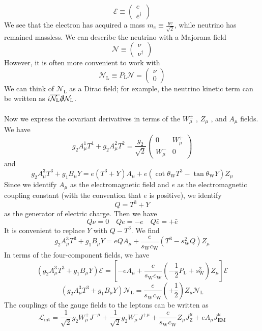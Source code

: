 \[\mathcal{E} \equiv \begin{pmatrix}
e \\ \bar{e}^{\dagger}
\end{pmatrix} \]
We see that the electron has acquired a mass $m_e \equiv \frac{yv}{\sqrt{2}}$, while neutrino has remained massless.
We can describe the neutrino with a Majorana field
\[\mathcal{N} \equiv \begin{pmatrix}
\nu \\ \nu^{\dagger}
\end{pmatrix}\]
However, it is often more convenient to work with
\[\mathcal{N}_{\mathrm{L}} \equiv P_{\mathrm{L}} \mathcal{N} = \begin{pmatrix}
\nu \\ 0
\end{pmatrix}\]
We can think of $\mathcal{N}_{\mathrm{L}}$ as a Dirac field; for example, the neutrino kinetic term can be written as $i\overline{\mathcal{N}_{\mathrm{L}}} \slashed{\partial} \mathcal{N}_{\mathrm{L}}$.
\\ \\
Now we express the covariant derivatives in terms of the $W_{\mu}^{\pm}$ , $Z_{\mu}$ , and $A_{\mu}$ fields. We have
\[g_2 A^1_{\mu}T^1 + g_2 A^2_{\mu}T^2 = \frac{g_2}{\sqrt{2}} \begin{pmatrix}
0 & W_{\mu}^+ \\ W^{-}_{\mu} & 0
\end{pmatrix} \]
and
\[g_2A^3_{\mu}T^3 + g_1 B_{\mu} Y = e(T^3+Y)A_{\mu} + e(\cot\theta_{\mathrm{W}} T^3 - \tan\theta_{\mathrm{W}} Y)Z_{\mu}\]
Since we identify $A_{\mu}$ as the electromagnetic field and $e$ as the electromagnetic coupling constant (with the convention that $e$ is positive), we identify
\[Q = T^3 + Y\]
as the generator of electric charge. Then we have
\[Q\nu = 0 \quad Qe = -e \quad Q\bar{e} = +\bar{e}\]
It is convenient to replace $Y$ with $Q - T^3$. We find
\[g_2A^3_{\mu}T^3 + g_1 B_{\mu} Y = eQA_{\mu} + \frac{e}{s_{\mathrm{W}} c_{\mathrm{W}}}( T^3 -  s_{\mathrm{W}}^2Q)Z_{\mu}\]
In terms of the four-component fields, we have
\[(g_2A^3_{\mu}T^3 + g_1 B_{\mu} Y) \mathcal{E} = \left[-eA_{\mu} + \frac{e}{s_{\mathrm{W}} c_{\mathrm{W}}}( -\frac{1}{2}P_{\mathrm{L}} +  s_{\mathrm{W}}^2)Z_{\mu} \right] \mathcal{E}\]
\[(g_2A^3_{\mu}T^3 + g_1 B_{\mu} Y) \mathcal{N}_{\mathrm{L}} = \frac{e}{s_{\mathrm{W}} c_{\mathrm{W}}} (+\frac{1}{2}) Z_{\mu}\mathcal{N}_{\mathrm{L}} \]
The couplings of the gauge fields to the leptons can be written as
\[\mathcal{L}_{\mathrm{int}} = \frac{1}{\sqrt{2}}g_2W_{\mu}^{+} J^{-\mu} + \frac{1}{\sqrt{2}}g_2W_{\mu}^{-} J^{+\mu} +  \frac{e}{s_{\mathrm{W}} c_{\mathrm{W}}} Z_{\mu}J_{\mathrm{Z}}^{\mu} + eA_{\mu}J^{\mu}_{\mathrm{EM}}\] 
